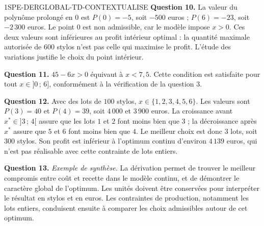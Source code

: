 \begin{corrige}{1SPE-DERGLOBAL-TD-CONTEXTUALISE}
\textbf{Question 10.}
La valeur du polynôme prolongé en $0$ est $P(0)=-5$, soit $-500$ euros ;
$P(6)=-23$, soit $-2\,300$ euros. Le point $0$ est non admissible, car le
modèle impose $x>0$. Ces deux valeurs sont inférieures au profit intérieur optimal :
la quantité maximale autorisée de $600$ stylos n'est pas celle qui maximise le profit.
L'étude des variations justifie le choix du point intérieur.

\textbf{Question 11.}
$45-6x>0$ équivaut à $x<7{,}5$. Cette condition est satisfaite pour tout
$x\in]0\,;\,6]$, conformément à la vérification de la question 3.

\textbf{Question 12.}
Avec des lots de $100$ stylos, $x\in\{1,2,3,4,5,6\}$.
Les valeurs sont $P(3)=40$ et $P(4)=39$, soit $4\,000$ et $3\,900$ euros.
La croissance avant $x^*\in]3\,;\,4[$ assure que les lots $1$ et $2$ font moins
bien que $3$ ; la décroissance après $x^*$ assure que $5$ et $6$ font moins
bien que $4$. Le meilleur choix est donc $3$ lots, soit $300$ stylos.
Son profit est inférieur à l'optimum continu d'environ $4\,139$ euros,
qui n'est pas réalisable avec cette contrainte de lots entiers.

\textbf{Question 13.}
\emph{Exemple de synthèse.}
La dérivation permet de trouver le meilleur compromis entre coût et recette
dans le modèle continu, et de démontrer le caractère global de l'optimum.
Les unités doivent être conservées pour interpréter le résultat en stylos et en euros.
Les contraintes de production, notamment les lots entiers, conduisent ensuite
à comparer les choix admissibles autour de cet optimum.
\end{corrige}
\fi

